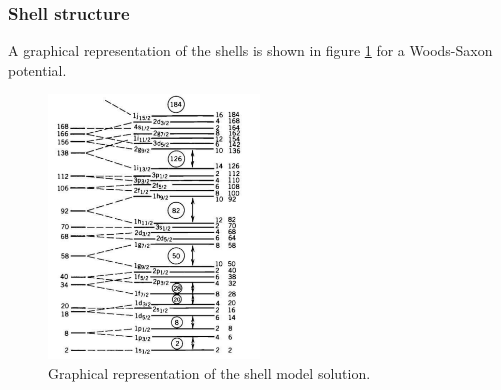\subsubsection{Shell structure}
A graphical representation of the shells is shown in figure \ref{fig:shell_model} for a Woods-Saxon potential. 
\begin{figure}[h]
    \centering
    \includegraphics[width=0.5\textwidth]{Images/ShellModel.png}
    \caption{Graphical representation of the shell model solution.}
    \label{fig:shell_model}
\end{figure}



